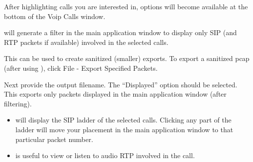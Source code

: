 \documentclass[letterpaper,10pt,english]{sphinxmanual}
\begin{document}

After highlighting calls you are interested in, options will become available at the bottom of the Voip Calls window.


 will generate a filter in the main application window to display only SIP (and RTP packets if available) involved in the selected calls.


This can be used to create sanitized (smaller) exports. To export a sanitized pcap (after using ), click File - Export Specified Packets.


Next provide the output filename. The “Displayed” option should be selected. This exports only packets displayed in the main application window (after filtering).

\begin{itemize}
\item {} 
 will display the SIP ladder of the selected calls. Clicking any part of the ladder will move your placement in the main application window to that particular packet number.

\end{itemize}

\begin{itemize}
\item {} 
 is useful to view or listen to audio RTP involved in the call.

\end{itemize}
\end{document}
